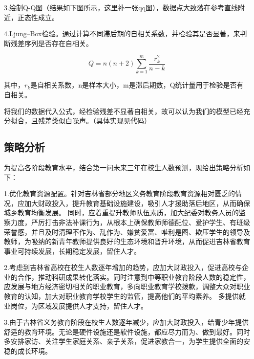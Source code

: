 \documentclass[UTF8, zihao=-4]{ctexart}
\begin{document}
3.绘制Q-Q图（结果如下图所示，这里补一张qq图），数据点大致落在参考直线附近，正态性成立。

4.Ljung–Box检验。通过计算不同滞后期的自相关系数，并检验其是否显著，来判断残差序列是否存在自相关。

\[Q = n(n+2) \sum_{k=1}^{m} \frac{r_k^2}{n-k}\]

其中，$r_k$是自相关系数，n是样本大小，m是滞后期数，Q统计量用于检验是否有自相关。

将我们的数据代入公式，经检验残差不显著自相关，故可以认为我们的模型已经充分拟合，且残差类似白噪声。（具体实现见代码）

\subsection{策略分析}
为提高各阶段教育水平，结合第一问未来三年在校生人数预测，现给出策略分析如下：

1.优化教育资源配置。针对吉林省部分地区义务教育阶段教育资源相对匮乏的情况，应加大财政投入，提升教育基础设施建设，吸引人才援助落后地区，从而确保城乡教育均衡发展。
同时，应着重提升教师队伍素质，加大纪委对教务人员的监察力度，严厉打击非法补课行为，从根本上确保教师师德配位、爱护学生、有班级荣誉感，并且及时清理不作为、乱作为、嫌贫爱富、唯利是图、欺压学生的领导及教师，为吸纳的新青年教师提供良好的生态环境和晋升环境，从而促进吉林省教育事业可持续发展，长期稳定发展，留住人才。

2.考虑到吉林省高校在校生人数逐年增加的趋势，应加大财政投入，促进高校与企业的合作，推动科研成果转化落实。同时注意到中等职业教育阶段人数的稳定性，应发展与地方经济密切相关的职业教育，多向职业教育学校拨款，调整大众对职业教育的认知，加大对职业教育学校学生的监管，提高他们的平均素养。
多提供就业岗位，为区域发展提供人才支持，留住人才。

3.由于吉林省义务教育阶段在校生人数逐年减少，应加大财政投入，给青少年提供舒适的教育环境。无论是硬件设施还是软件设施，都应尽力而为、做到最好。同时多安排家访、关注学生家庭关系、亲子关系，促进家教合一，为学生提供全面的安稳的成长环境。
\end{document}
